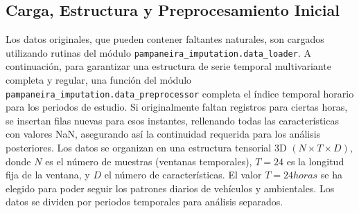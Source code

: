 \subsection{Carga, Estructura y Preprocesamiento Inicial}
\label{subsec:load_preprocess_revised}
Los datos originales, que pueden contener faltantes naturales, son cargados utilizando rutinas del módulo \texttt{pampaneira\_imputation.data\_loader}. 
A continuación, para garantizar una estructura de serie temporal multivariante completa y regular, una función del módulo \texttt{pampaneira\_imputation.data\_preprocessor} completa el índice temporal horario para los periodos de estudio. Si originalmente faltan registros para ciertas horas, se insertan filas nuevas para esos instantes, rellenando todas las características con valores NaN, asegurando así la continuidad requerida para los análisis posteriores. 
Los datos se organizan en una estructura tensorial 3D $(N \times T \times D)$, donde $N$ es el número de muestras (ventanas temporales), $T=24$ es la longitud fija de la ventana, y $D$ el número de características. El valor $T=24 horas$ se ha elegido para poder seguir los patrones diarios de vehículos y ambientales. Los datos se dividen por periodos temporales para análisis separados.

